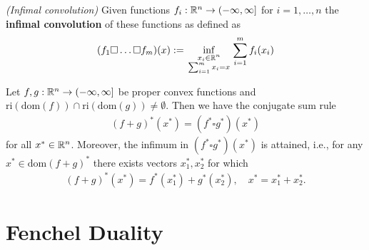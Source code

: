 
\begin{definition}
  \emph{(Infimal convolution)}
  Given functions
  $
    f_i:
    \mathbb{R}^n \to (-\infty, \infty]
  $
  for $ i = 1, \ldots, n $
  the \textbf{infimal convolution} of these functions as defined as
  \begin{gather}
    (f_1 \square \ldots \square f_m)(x)
    :=
    \inf_{
    \begin{smallmatrix}
      x_i \in \mathbb{R}^n \\
      \sum_{i = 1}^{m} 
        x_i
      =
      x
    \end{smallmatrix}
    }
    \sum_{i = 1}^{m}
      f_i(x_i)
  \end{gather}
\end{definition}


\begin{theorem}
  Let
  $
    f,g:
    \mathbb{R}^n \to (-\infty, \infty]
  $
  be proper convex functions 
  and
  $
  \text{ri}\left( \text{dom}(f) \right)
  \cap
  \text{ri}\left( \text{dom}(g) \right)
  \neq 
  \emptyset
  .
  $
  Then we have the conjugate sum rule
  \begin{gather}
    ( f + g )^*(x^*)
    =
    ( f^* \square g^*)(x^*)
  \end{gather}
  for all $x^* \in \mathbb{R}^n$.
  Moreover, the infimum in 
  $
    ( f^* \square g^*)(x^*)
  $
  is attained, i.e., for any
  $
    x^* \in \text{dom}(f+g)^*
  $
  there exists vectors $x_1^*, x_2^*$
  for which
  \begin{gather}
    (f+g)^*(x^*)
    =
    f^*(x_1^*)
    +
    g^*(x_2^*),
    \quad
    x^* = x_1^* + x_2^*.
  \end{gather}
\end{theorem}


\section{Fenchel Duality}


